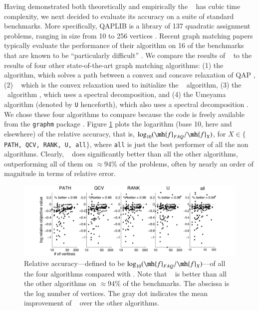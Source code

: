 \documentclass[preprint,11pt]{elsarticle}
\begin{document}
Having demonstrated both theoretically and empirically the \FAQ~ has cubic time complexity, we next decided to evaluate its accuracy on a suite of standard benchmarks.  More specifically, QAPLIB is a library of 137 quadratic assignment problems, ranging in size from 10 to 256 vertices \cite{Burkard1997}.  Recent graph matching papers typically evaluate the performance of their algorithm on 16 of the benchmarks that are known to be ``particularly difficult'' \cite{Zaslavskiy2009,Schellewald2001}.  We compare the results of \FAQ~ to the results of four other state-of-the-art graph matching algorithms: (1) the \Path~ algorithm, which solves a path between a convex and concave relaxation of QAP \cite{Zaslavskiy2009}, (2) \Qcv~ which is the convex relaxation used to initialize the \Path~ algorithm, (3) the \Rank~algorithm \cite{Singh2007}, which uses a spectral decomposition, and (4)  the Umeyama algorithm (denoted by \texttt{U} henceforth), which also uses a spectral decomposition \cite{Umeyama1988}.  We chose these four algorithms to compare because the code is freely available from the \texttt{graphm} package \cite{Zaslavskiy2009}.  
Figure \ref{fig:allRelAccuracy} plots the logarithm (base 10, here and elsewhere) of the relative accuracy, that is, $\log_{10}(\mh{f}_{FAQ}/\mh{f}_X)$, for $X \in \{$\texttt{PATH, QCV, RANK, U, all}$\}$, where \texttt{all} is just the best performer of all the non \FAQ~ algorithms.  Clearly, \FAQ~ does significantly better than all the other algorithms, outperforming all of them on $\approx 94\%$ of the problems, often by nearly an order of magnitude in terms of relative error.

\begin{figure}[htbp]
	\centering
		\includegraphics[width=1.0\linewidth]{../figs/allRelAccuracy.pdf}
	\caption{Relative accuracy---defined to be $\log_{10}(\mh{f}_{FAQ}/\mh{f}_X)$---of all the four algorithms compared with \FAQ.  Note that \FAQ~ is better than all the other algorithms on $\approx 94\%$ of the benchmarks. The abscissa is the log number of vertices.  The gray dot indicates the mean improvement of \FAQ~ over the other algorithms.}
	\label{fig:allRelAccuracy}
\end{figure}
\end{document}
